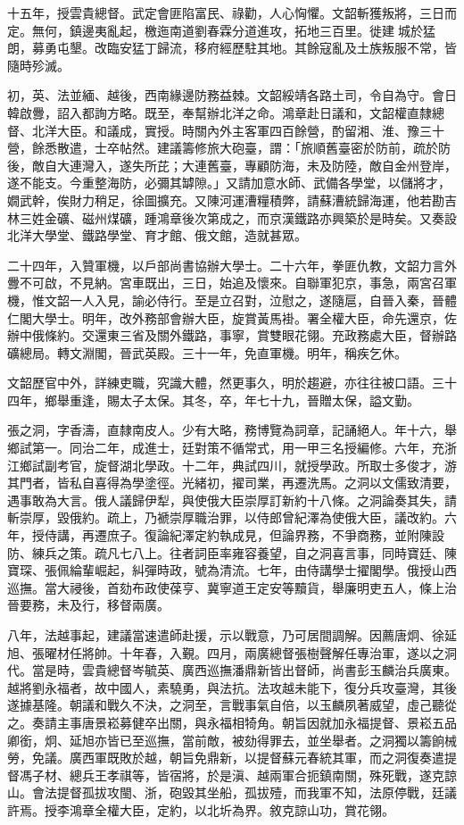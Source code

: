 \begin{pinyinscope}
十五年，授雲貴總督。武定會匪陷富民、祿勸，人心恟懼。文韶斬獲叛將，三日而定。無何，鎮邊夷亂起，檄迤南道劉春霖分道進攻，拓地三百里。徙建城於猛朗，募勇屯墾。改臨安猛丁歸流，移府經歷駐其地。其餘寇亂及土族叛服不常，皆隨時殄滅。

初，英、法並緬、越後，西南緣邊防務益棘。文韶綏靖各路土司，令自為守。會日韓啟釁，詔入都詢方略。既至，奉幫辦北洋之命。鴻章赴日議和，文韶權直隸總督、北洋大臣。和議成，實授。時關內外主客軍四百餘營，酌留湘、淮、豫三十營，餘悉散遣，士卒帖然。建議籌修旅大砲臺，謂：「旅順舊臺密於防前，疏於防後，敵自大連灣入，遂失所芘；大連舊臺，專顧防海，未及防陸，敵自金州登岸，遂不能支。今重整海防，必彌其罅隙。」又請加意水師、武備各學堂，以儲將才，嫺武幹，俟財力稍足，徐圖擴充。又陳河運漕糧積弊，請蘇漕統歸海運，他若勘吉林三姓金礦、磁州煤礦，踵鴻章後次第成之，而京漢鐵路亦興築於是時矣。又奏設北洋大學堂、鐵路學堂、育才館、俄文館，造就甚眾。

二十四年，入贊軍機，以戶部尚書協辦大學士。二十六年，拳匪仇教，文韶力言外釁不可啟，不見納。宮車既出，三日，始追及懷來。自聯軍犯京，事急，兩宮召軍機，惟文韶一人入見，諭必侍行。至是立召對，泣慰之，遂隨扈，自晉入秦，晉體仁閣大學士。明年，改外務部會辦大臣，旋賞黃馬褂。署全權大臣，命先還京，佐辦中俄條約。交還東三省及關外鐵路，事寧，賞雙眼花翎。充政務處大臣，督辦路礦總局。轉文淵閣，晉武英殿。三十一年，免直軍機。明年，稱疾乞休。

文韶歷官中外，詳練吏職，究識大體，然更事久，明於趨避，亦往往被口語。三十四年，鄉舉重逢，賜太子太保。其冬，卒，年七十九，晉贈太保，謚文勤。

張之洞，字香濤，直隸南皮人。少有大略，務博覽為詞章，記誦絕人。年十六，舉鄉試第一。同治二年，成進士，廷對策不循常式，用一甲三名授編修。六年，充浙江鄉試副考官，旋督湖北學政。十二年，典試四川，就授學政。所取士多俊才，游其門者，皆私自喜得為學塗徑。光緒初，擢司業，再遷洗馬。之洞以文儒致清要，遇事敢為大言。俄人議歸伊犁，與使俄大臣崇厚訂新約十八條。之洞論奏其失，請斬崇厚，毀俄約。疏上，乃褫崇厚職治罪，以侍郎曾紀澤為使俄大臣，議改約。六年，授侍講，再遷庶子。復論紀澤定約執成見，但論界務，不爭商務，並附陳設防、練兵之策。疏凡七八上。往者詞臣率雍容養望，自之洞喜言事，同時寶廷、陳寶琛、張佩綸輩崛起，糾彈時政，號為清流。七年，由侍講學士擢閣學。俄授山西巡撫。當大祲後，首劾布政使葆亨、冀寧道王定安等黷貨，舉廉明吏五人，條上治晉要務，未及行，移督兩廣。

八年，法越事起，建議當速遣師赴援，示以戰意，乃可居間調解。因薦唐炯、徐延旭、張曜材任將帥。十年春，入覲。四月，兩廣總督張樹聲解任專治軍，遂以之洞代。當是時，雲貴總督岑毓英、廣西巡撫潘鼎新皆出督師，尚書彭玉麟治兵廣東。越將劉永福者，故中國人，素驍勇，與法抗。法攻越未能下，復分兵攻臺灣，其後遂據基隆。朝議和戰久不決，之洞至，言戰事氣自倍，以玉麟夙著威望，虛己聽從之。奏請主事唐景崧募健卒出關，與永福相犄角。朝旨因就加永福提督、景崧五品卿銜，炯、延旭亦皆已至巡撫，當前敵，被劾得罪去，並坐舉者。之洞獨以籌餉械勞，免議。廣西軍既敗於越，朝旨免鼎新，以提督蘇元春統其軍，而之洞復奏遣提督馮子材、總兵王孝祺等，皆宿將，於是滇、越兩軍合扼鎮南關，殊死戰，遂克諒山。會法提督孤拔攻閩、浙，砲毀其坐船，孤拔殪，而我軍不知，法原停戰，廷議許焉。授李鴻章全權大臣，定約，以北圻為界。敘克諒山功，賞花翎。


\end{pinyinscope}
